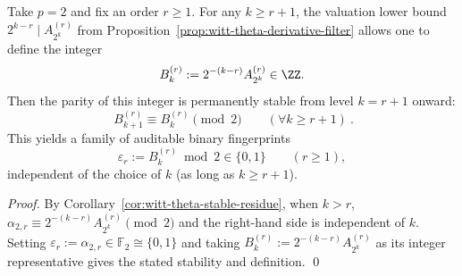 \begin{corollary}[Stable parity fingerprint for \texorpdfstring{$p=2$}{p=2}: the \texorpdfstring{$\theta$}{theta}-derivatives generate an infinite family of binary invariants]\label{cor:witt-theta-binary-fingerprint}
Take \(p=2\) and fix an order \(r\ge 1\). For any \(k\ge r+1\), the valuation lower bound \(2^{k-r}\mid A_{2^k}^{(r)}\) from Proposition~\ref{prop:witt-theta-derivative-filter} allows one to define the integer
\[
B_k^{(r)}:=2^{-(k-r)}A_{2^k}^{(r)}\in\ZZ.
\]
Then the parity of this integer is permanently stable from level \(k=r+1\) onward:
\[
\boxed{\ B_{k+1}^{(r)}\equiv B_{k}^{(r)}\pmod 2\qquad(\forall k\ge r+1)\ }.
\]
This yields a family of auditable binary fingerprints
\[
\varepsilon_r:=B_{k}^{(r)}\bmod 2\in\{0,1\}\qquad(r\ge 1),
\]
independent of the choice of \(k\) (as long as \(k\ge r+1\)).
\end{corollary}
\begin{proof}
By Corollary~\ref{cor:witt-theta-stable-residue}, when \(k>r\),
\(
\alpha_{2,r}\equiv 2^{-(k-r)}A_{2^k}^{(r)}\pmod 2
\)
and the right-hand side is independent of \(k\).
Setting \(\varepsilon_r:=\alpha_{2,r}\in\mathbb{F}_2\cong\{0,1\}\) and taking
\(
B_k^{(r)}:=2^{-(k-r)}A_{2^k}^{(r)}
\)
as its integer representative gives the stated stability and definition.
\qed
\end{proof}

